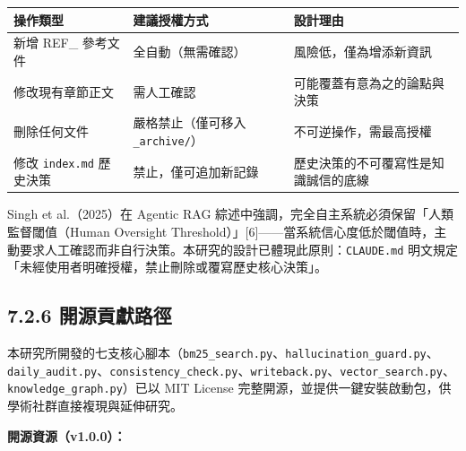 {\def\LTcaptype{none} %
\begin{longtable}[]{@{}
  >{\raggedright\arraybackslash}p{}
  >{\raggedright\arraybackslash}p{}
  >{\raggedright\arraybackslash}p{}@{}}
\toprule\noalign{}
\begin{minipage}[b]{\linewidth}\raggedright
操作類型
\end{minipage} & \begin{minipage}[b]{\linewidth}\raggedright
建議授權方式
\end{minipage} & \begin{minipage}[b]{\linewidth}\raggedright
設計理由
\end{minipage} \\
\midrule\noalign{}
\endhead
\bottomrule\noalign{}
\endlastfoot
新增 REF\_ 參考文件 & 全自動（無需確認） & 風險低，僅為增添新資訊 \\
修改現有章節正文 & 需人工確認 & 可能覆蓋有意為之的論點與決策 \\
刪除任何文件 & 嚴格禁止（僅可移入 \texttt{\_archive/}） &
不可逆操作，需最高授權 \\
修改 \texttt{index.md} 歷史決策 & 禁止，僅可追加新記錄 &
歷史決策的不可覆寫性是知識誠信的底線 \\
\end{longtable}
}

Singh et al.（2025）在 Agentic RAG
綜述中強調，完全自主系統必須保留「人類監督閾值（Human Oversight
Threshold）」{[}6{]}------當系統信心度低於閾值時，主動要求人工確認而非自行決策。本研究的設計已體現此原則：\texttt{CLAUDE.md}
明文規定「未經使用者明確授權，禁止刪除或覆寫歷史核心決策」。

\subsection{7.2.6
開源貢獻路徑}\label{ux958bux6e90ux8ca2ux737bux8defux5f91}

本研究所開發的七支核心腳本（\texttt{bm25\_search.py}、\texttt{hallucination\_guard.py}、\texttt{daily\_audit.py}、\texttt{consistency\_check.py}、\texttt{writeback.py}、\texttt{vector\_search.py}、\texttt{knowledge\_graph.py}）已以
MIT License
完整開源，並提供一鍵安裝啟動包，供學術社群直接複現與延伸研究。

\textbf{開源資源（v1.0.0）：}


